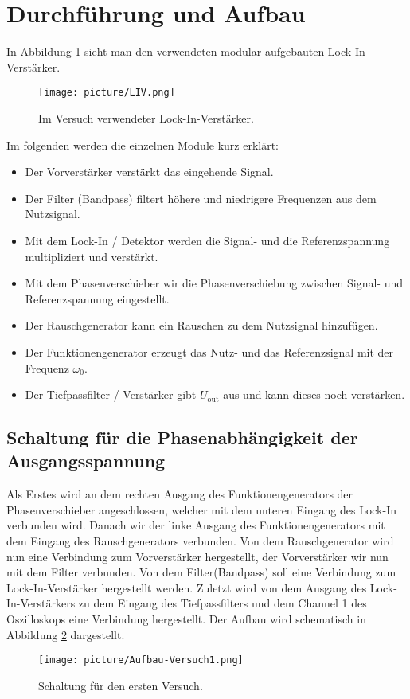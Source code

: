 \section{Durchführung und Aufbau}
\label{sec:Durchführung}

In Abbildung \ref{img:LIV} sieht man den verwendeten modular aufgebauten Lock-In-Verstärker.
\begin{figure}[H]
	\centering
	\texttt{[image: picture/LIV.png]}
	\caption{Im Versuch verwendeter Lock-In-Verstärker. \cite[3]{sample}}
  \label{img:LIV}
\end{figure}
Im folgenden werden die einzelnen Module kurz erklärt:
\begin{itemize}
	\item Der Vorverstärker verstärkt das eingehende Signal.
	\item Der Filter (Bandpass) filtert höhere und niedrigere Frequenzen aus dem Nutzsignal.
	\item Mit dem Lock-In / Detektor werden die Signal- und die Referenzspannung multipliziert und verstärkt.
	\item Mit dem Phasenverschieber wir die Phasenverschiebung zwischen Signal- und Referenzspannung eingestellt.
	\item Der Rauschgenerator kann ein Rauschen zu dem Nutzsignal hinzufügen.
	\item Der Funktionengenerator erzeugt das Nutz- und das Referenzsignal mit der Frequenz $\omega_0$.
	\item Der Tiefpassfilter / Verstärker gibt $U_\text{out}$ aus und kann dieses noch verstärken.
\end{itemize}
\newpage

\subsection{Schaltung für die Phasenabhängigkeit der Ausgangsspannung}
Als Erstes wird an dem rechten Ausgang des Funktionengenerators der Phasenverschieber angeschlossen, welcher mit dem unteren Eingang des Lock-In verbunden wird. Danach wir der linke Ausgang des Funktionengenerators mit dem Eingang des Rauschgenerators verbunden. Von dem Rauschgenerator wird nun eine Verbindung zum Vorverstärker hergestellt, der Vorverstärker wir nun mit dem Filter verbunden. Von dem Filter(Bandpass) soll eine Verbindung zum Lock-In-Verstärker hergestellt werden. Zuletzt wird von dem Ausgang des Lock-In-Verstärkers zu dem Eingang des Tiefpassfilters und dem Channel 1 des Oszilloskops eine Verbindung hergestellt. Der Aufbau wird schematisch in Abbildung \ref{img:V1} dargestellt.
\begin{figure}[H]
	\centering
	\texttt{[image: picture/Aufbau-Versuch1.png]}
	\caption{Schaltung für den ersten Versuch. \cite[4]{sample}}
  \label{img:V1}
\end{figure}

